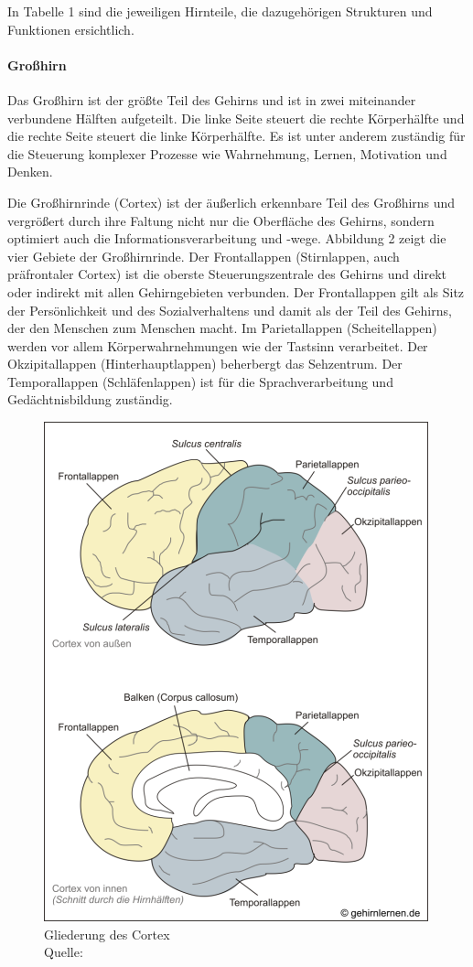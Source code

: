 In Tabelle 1 sind die jeweiligen Hirnteile, die dazugehörigen Strukturen und Funktionen ersichtlich.

\paragraph*{Großhirn}
Das Großhirn ist der größte Teil des Gehirns und ist in zwei miteinander verbundene Hälften aufgeteilt. Die linke Seite steuert die rechte Körperhälfte und die rechte Seite steuert die linke Körperhälfte. Es ist unter anderem zuständig für die \glqq Steuerung komplexer Prozesse wie Wahrnehmung, Lernen, Motivation und Denken.\grqq \citep[S. 115]{Kirschbaum.2008}

Die Großhirnrinde (Cortex) ist der äußerlich erkennbare Teil des Großhirns und vergrößert durch ihre Faltung nicht nur die Oberfläche des Gehirns, sondern optimiert auch die Informationsverarbeitung und -wege. \citep[S. 8]{Nowka.2013} Abbildung 2 zeigt die vier Gebiete der Großhirnrinde. Der Frontallappen (Stirnlappen, auch präfrontaler Cortex) ist die oberste Steuerungszentrale des Gehirns und direkt oder indirekt mit allen Gehirngebieten verbunden. Der Frontallappen gilt als Sitz der Persönlichkeit und des Sozialverhaltens und damit als der Teil des Gehirns, der den Menschen zum Menschen macht. Im Parietallappen (Scheitellappen) werden vor allem Körperwahrnehmungen wie der Tastsinn verarbeitet. Der Okzipitallappen (Hinterhauptlappen) beherbergt das Sehzentrum. Der Temporallappen (Schläfenlappen) ist für die Sprachverarbeitung und Gedächtnisbildung zuständig. \citep{Schaefers.2014}

\begin{figure}[!h]
\centering
\includegraphics[width=0.8\linewidth]{grafiken/abb3.png}
\caption{Gliederung des Cortex\\ Quelle:  \cite{Schaefers.2014}}
\label{fig:Gehirn3}
\end{figure}

